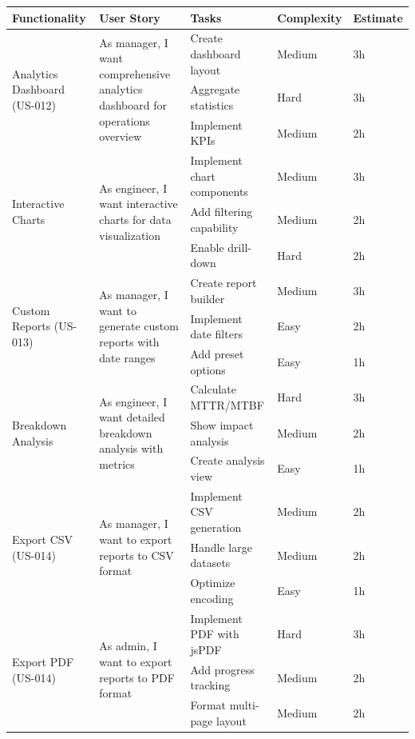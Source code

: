 \begin{table}[H]
\centering
\small
\begin{tabular}{|p{2.5cm}|p{4cm}|p{3.2cm}|p{2.2cm}|p{1.5cm}|}
\hline
\textbf{Functionality} & \textbf{User Story} & \textbf{Tasks} & \textbf{Complexity} & \textbf{Estimate} \\
\hline

\multirow{3}{2.5cm}{Analytics Dashboard (US-012)} & 
\multirow{3}{4cm}{As manager, I want comprehensive analytics dashboard for operations overview}
& Create dashboard layout & Medium & 3h \\
\cline{3-5}
& & Aggregate statistics & Hard & 3h \\
\cline{3-5}
& & Implement KPIs & Medium & 2h \\
\hline

\multirow{3}{2.5cm}{Interactive Charts} & 
\multirow{3}{4cm}{As engineer, I want interactive charts for data visualization}
& Implement chart components & Medium & 3h \\
\cline{3-5}
& & Add filtering capability & Medium & 2h \\
\cline{3-5}
& & Enable drill-down & Hard & 2h \\
\hline

\multirow{3}{2.5cm}{Custom Reports (US-013)} & 
\multirow{3}{4cm}{As manager, I want to generate custom reports with date ranges}
& Create report builder & Medium & 3h \\
\cline{3-5}
& & Implement date filters & Easy & 2h \\
\cline{3-5}
& & Add preset options & Easy & 1h \\
\hline

\multirow{3}{2.5cm}{Breakdown Analysis} & 
\multirow{3}{4cm}{As engineer, I want detailed breakdown analysis with metrics}
& Calculate MTTR/MTBF & Hard & 3h \\
\cline{3-5}
& & Show impact analysis & Medium & 2h \\
\cline{3-5}
& & Create analysis view & Easy & 1h \\
\hline

\multirow{3}{2.5cm}{Export CSV (US-014)} & 
\multirow{3}{4cm}{As manager, I want to export reports to CSV format}
& Implement CSV generation & Medium & 2h \\
\cline{3-5}
& & Handle large datasets & Medium & 2h \\
\cline{3-5}
& & Optimize encoding & Easy & 1h \\
\hline

\multirow{3}{2.5cm}{Export PDF (US-014)} & 
\multirow{3}{4cm}{As admin, I want to export reports to PDF format}
& Implement PDF with jsPDF & Hard & 3h \\
\cline{3-5}
& & Add progress tracking & Medium & 2h \\
\cline{3-5}
& & Format multi-page layout & Medium & 2h \\
\hline


\end{tabular}
\end{table}
